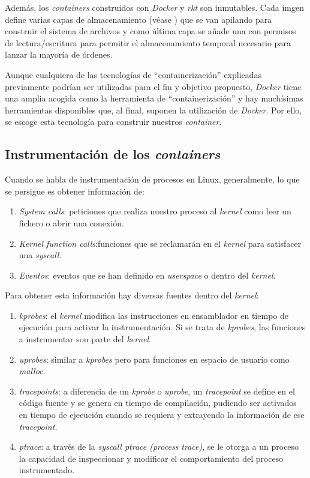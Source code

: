 Además, los \emph{containers} construidos con \emph{Docker} y \emph{rkt} son inmutables. Cada imgen define varias capas de almacenamiento (véase \cite{docker-storage}) que se van apilando
para construir el sistema de archivos y como última capa se añade una con permisos de lectura/escritura para permitir el almacenamiento temporal necesario para lanzar
la mayoría de órdenes.

Aunque cualquiera de las tecnologías de ``containerización'' explicadas previamente podrían ser utilizadas para el fin y objetivo propuesto, \emph{Docker} tiene una amplia acogida como la herramienta de ``containerización''
y hay muchísimas herramientas disponibles que, al final, suponen la utilización de \emph{Docker}. Por ello, se escoge esta tecnología para construir nuestros \emph{container}.

\subsection{Instrumentación de los \emph{containers}}
\label{subsec:instrumentacion-containers}

Cuando se habla de instrumentación de procesos en Linux, generalmente, lo que se persigue es obtener información de:
\begin{enumerate}
    \item \emph{System calls}: peticiones que realiza nuestro proceso al \emph{kernel} como leer un fichero o abrir una conexión.
    \item \emph{Kernel function calls}:funciones que se reclamarán en el \emph{kernel} para satisfacer una \emph{syscall}.
    \item \emph{Eventos}: eventos que se han definido en \emph{userspace} o dentro del \emph{kernel}.
\end{enumerate}

Para obtener esta información hay diversas fuentes dentro del \emph{kernel}:

\begin{enumerate}
    \item \emph{kprobes}: el \emph{kernel} modifica las instrucciones en ensamblador en tiempo de ejecución para activar la instrumentación. Si se trata
    de \emph{kprobes}, las funciones a instrumentar son parte del \emph{kernel}. 
    \item \emph{uprobes}: similar a \emph{kprobes} pero para funciones en espacio de usuario como \emph{malloc}.
    \item \emph{tracepoints}: a diferencia de un \emph{kprobe} o \emph{uprobe}, un \emph{tracepoint} se define en el código fuente y se genera en tiempo de compilación, pudiendo ser activados en tiempo de ejecución cuando se requiera y extrayendo la información de ese \emph{tracepoint}.
    \item \emph{ptrace}: a través de la \emph{syscall ptrace (process trace)}, se le otorga a un proceso la capacidad de inspeccionar y modificar el comportamiento del proceso instrumentado. 
\end{enumerate}

